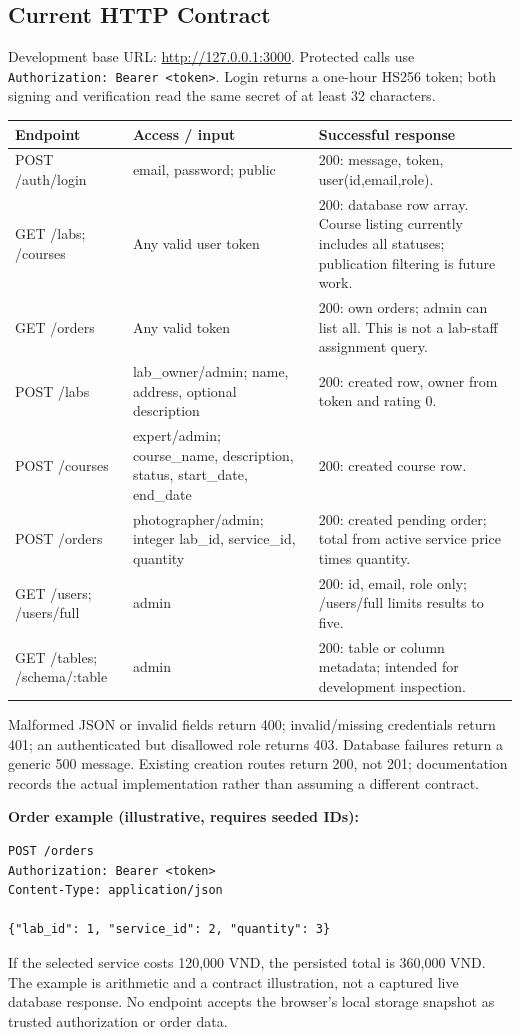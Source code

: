 \subsection{Current HTTP Contract}
Development base URL: \url{http://127.0.0.1:3000}. Protected calls use
\texttt{Authorization: Bearer <token>}. Login returns a one-hour HS256 token;
both signing and verification read the same secret of at least 32 characters.
\begin{longtable}{p{}p{}p{}}
\toprule\textbf{Endpoint} & \textbf{Access / input} & \textbf{Successful response}\\\midrule\endhead
POST /auth/login & email, password; public & 200: message, token, user(id,email,role).\\
GET /labs; /courses & Any valid user token & 200: database row array. Course listing currently includes all statuses; publication filtering is future work.\\
GET /orders & Any valid token & 200: own orders; admin can list all. This is not a lab-staff assignment query.\\
POST /labs & lab\_owner/admin; name, address, optional description & 200: created row, owner from token and rating 0.\\
POST /courses & expert/admin; course\_name, description, status, start\_date, end\_date & 200: created course row.\\
POST /orders & photographer/admin; integer lab\_id, service\_id, quantity & 200: created pending order; total from active service price times quantity.\\
GET /users; /users/full & admin & 200: id, email, role only; /users/full limits results to five.\\
GET /tables; /schema/:table & admin & 200: table or column metadata; intended for development inspection.\\
\bottomrule
\end{longtable}
Malformed JSON or invalid fields return 400; invalid/missing credentials return
401; an authenticated but disallowed role returns 403. Database failures return
a generic 500 message. Existing creation routes return 200, not 201; documentation
records the actual implementation rather than assuming a different contract.

\textbf{Order example (illustrative, requires seeded IDs):}
\begin{verbatim}
POST /orders
Authorization: Bearer <token>
Content-Type: application/json

{"lab_id": 1, "service_id": 2, "quantity": 3}
\end{verbatim}
If the selected service costs 120,000 VND, the persisted total is 360,000 VND.
The example is arithmetic and a contract illustration, not a captured live
database response. No endpoint accepts the browser's local storage snapshot as
trusted authorization or order data.

